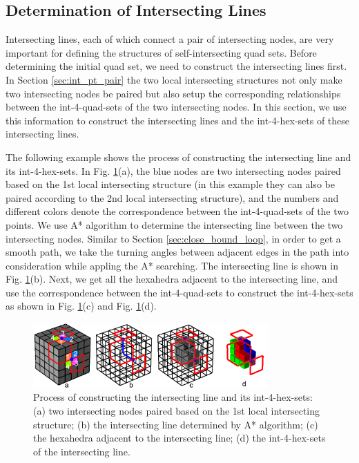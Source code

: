 \documentclass[final,5p,times,twocolumn]{elsarticle}
\begin{document}
\subsection{Determination of Intersecting Lines}
\label{sec:det_int_lines}
Intersecting lines, each of which connect a pair of intersecting nodes, are very important for defining the structures of self-intersecting quad sets. Before determining the initial quad set, we need to construct the intersecting lines first. In Section \ref{sec:int_pt_pair} the two local intersecting structures not only make two intersecting nodes be paired but also setup the corresponding relationships between the int-4-quad-sets of the two intersecting nodes. In this section, we use this information to construct the intersecting lines and the int-4-hex-sets of these intersecting lines.

The following example shows the process of constructing the intersecting line and its int-4-hex-sets. In Fig. \ref{fig:det_int_line}(a), the blue nodes are two intersecting nodes paired based on the 1st local intersecting structure (in this example they can also be paired according to the 2nd local intersecting structure), and the numbers and different colors denote the correspondence between the int-4-quad-sets of the two points. We use A* algorithm to determine the intersecting line between the two intersecting nodes. Similar to Section \ref{sec:close_bound_loop}, in order to get a smooth path, we take the turning angles between adjacent edges in the path into consideration while appling the A* searching. The intersecting line is shown in Fig. \ref{fig:det_int_line}(b). Next, we get all the hexahedra adjacent to the intersecting line, and use the correspondence between the int-4-quad-sets to construct the int-4-hex-sets as shown in Fig. \ref{fig:det_int_line}(c) and Fig. \ref{fig:det_int_line}(d).

\begin{figure}[htbp]
\begin{center}
\includegraphics[width=9cm]{det_int_line.png}
\caption{Process of constructing the intersecting line and its int-4-hex-sets: (a) two intersecting nodes paired based on the 1st local intersecting structure; (b) the intersecting line determined by A* algorithm; (c) the hexahedra adjacent to the intersecting line; (d) the int-4-hex-sets of the intersecting line.}
\label{fig:det_int_line}
\end{center}
\end{figure}
\end{document}
